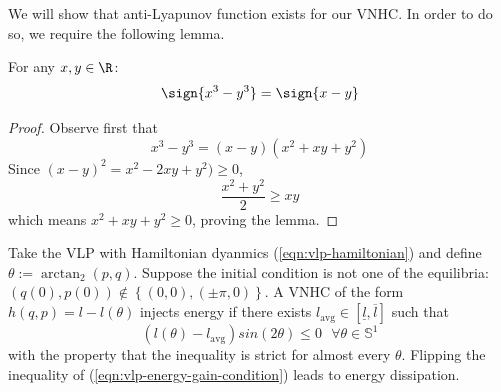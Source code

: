 We will show that anti-Lyapunov function exists for our VNHC.
In order to do so, we require the following lemma.

\begin{lemma}\label{lemma:sign-of-cube}
   For any \(x,y \in \R\):
   \[
      \sign{x^3 - y^3} = \sign{x-y}
   \]
\end{lemma}
\begin{proof}
   Observe first that
   \[
      x^3 - y^3 =  (x-y)(x^2 + xy + y^2)
   \]
   Since \( (x-y)^2 = x^2 - 2xy + y^2) \geq 0 \), 
   \[
      \frac{x^2 + y^2}{2} \geq xy
   \]
   which means \(x^2 + xy + y^2 \geq 0\), proving the lemma.
\end{proof}

\begin{thm}\label{thm:vlp-energy-stabilization}
   Take the VLP with Hamiltonian dyanmics (\ref{eqn:vlp-hamiltonian}) and define
   \(\theta := \arctan_2(p,q)\). Suppose the initial condition is not one of the
   equilibria: \((q(0),p(0)) \not \in \left\{(0,0), (\pm\pi,0)\right\}\).
   A VNHC of the form \(h(q,p) = l - l(\theta)\) injects energy if there exists 
   \(l_\text{avg} \in [\underline{l},\overline{l}]\) such that 
   \begin{equation}\label{eqn:vlp-energy-gain-condition}
      \left(l(\theta) - l_\text{avg}\right)sin(2\theta) \leq 0 \text{ }\forall \theta \in \mathbb{S}^1
   \end{equation}
   with the property that the inequality is strict for almost every \(\theta\).
   Flipping the inequality of (\ref{eqn:vlp-energy-gain-condition}) leads to
   energy dissipation.
\end{thm}
